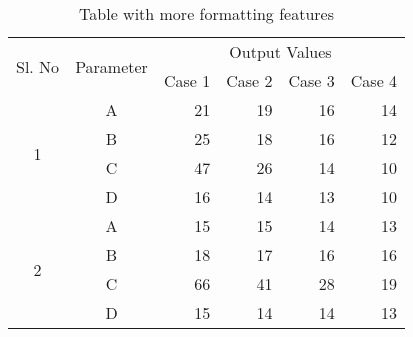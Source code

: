 \begin{table}
\caption{\label{Tab2}Table with more formatting features}
\begin{center}
\begin{tabular}{|c|c|r|r|r|r|}\hline 
\multirow{2}{*}{Sl. No} &\multirow{2}{*}{Parameter} 
&\multicolumn{4}{c|}{Output Values}\\ \cline{3-6} 
& &Case 1 &Case 2 &Case 3 &Case 4 \\ \hline \hline
\multirow{4}{*}{1} & A & 21 & 19 & 16 & 14  \\
                   & B & 25 & 18 & 16 & 12  \\
                   & C & 47 & 26 & 14 & 10  \\
                   & D & 16 & 14 & 13 & 10  \\ \hline
\multirow{4}{*}{2} & A & 15 & 15 & 14 & 13  \\
                   & B & 18 & 17 & 16 & 16  \\
                   & C & 66 & 41 & 28 & 19  \\
                   & D & 15 & 14 & 14 & 13  \\ \hline
\end{tabular}
\end{center}
\end{table}

